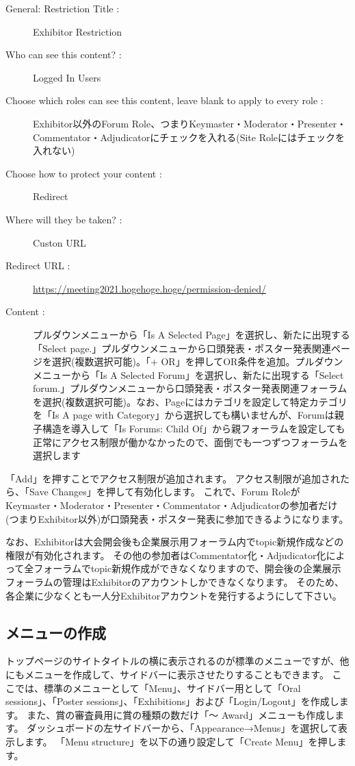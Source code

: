 \documentclass[titlepage,10pt,a4paper,uplatex]{jsbook}
\begin{document}
\begin{description}
\item[General: Restriction Title : ] Exhibitor Restriction
\item[Who can see this content? : ] Logged In Users
\item[Choose which roles can see this content, leave blank to apply to every role : ] Exhibitor以外のForum Role、つまりKeymaster・Moderator・Presenter・Commentator・Adjudicatorにチェックを入れる(Site Roleにはチェックを入れない)
\item[Choose how to protect your content : ] Redirect
\item[Where will they be taken? : ] Custon URL
\item[Redirect URL : ] \url{https://meeting2021.hogehoge.hoge/permission-denied/}
\item[Content : ] プルダウンメニューから「Is A Selected Page」を選択し、新たに出現する「Select page.」プルダウンメニューから口頭発表・ポスター発表関連ページを選択(複数選択可能)。「+ OR」を押してOR条件を追加。プルダウンメニューから「Is A Selected Forum」を選択し、新たに出現する「Select forum.」プルダウンメニューから口頭発表・ポスター発表関連フォーラムを選択(複数選択可能)。なお、Pageにはカテゴリを設定して特定カテゴリを「Is A page with Category」から選択しても構いませんが、Forumは親子構造を導入して「Is Forums: Child Of」から親フォーラムを設定しても正常にアクセス制限が働かなかったので、面倒でも一つずつフォーラムを選択します
\end{description}

「Add」を押すことでアクセス制限が追加されます。
アクセス制限が追加されたら、「Save Changes」を押して有効化します。
これで、Forum RoleがKeymaster・Moderator・Presenter・Commentator・Adjudicatorの参加者だけ(つまりExhibitor以外)が口頭発表・ポスター発表に参加できるようになります。

なお、Exhibitorは大会開会後も企業展示用フォーラム内でtopic新規作成などの権限が有効化されます。
その他の参加者はCommentator化・Adjudicator化によって全フォーラムでtopic新規作成ができなくなりますので、開会後の企業展示フォーラムの管理はExhibitorのアカウントしかできなくなります。
そのため、各企業に少なくとも一人分Exhibitorアカウントを発行するようにして下さい。

\subsection{メニューの作成}

トップページのサイトタイトルの横に表示されるのが標準のメニューですが、他にもメニューを作成して、サイドバーに表示させたりすることもできます。
ここでは、標準のメニューとして「Menu」、サイドバー用として「Oral sessions」、「Poster sessions」、「Exhibitions」および「Login/Logout」を作成します。
また、賞の審査員用に賞の種類の数だけ「～ Award」メニューも作成します。
ダッシュボードの左サイドバーから、「Appearance→Menus」を選択して表示します。
「Menu structure」を以下の通り設定して「Create Menu」を押します。
\end{document}
